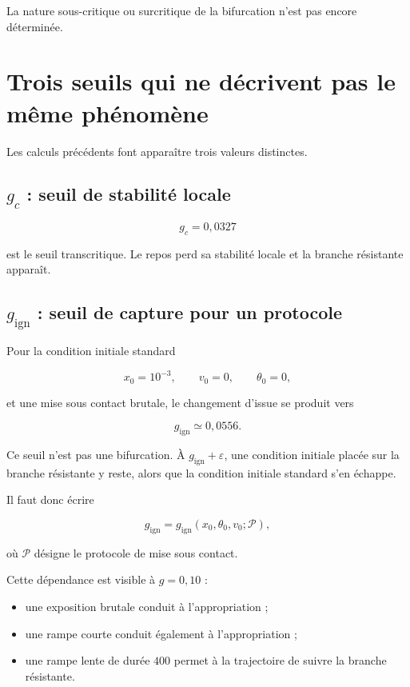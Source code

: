 La nature sous-critique ou surcritique de la bifurcation n'est pas encore déterminée.

\chapter{Trois seuils qui ne décrivent pas le même phénomène}\label{t2-trois-seuils-phenomenes-distincts}

Les calculs précédents font apparaître trois valeurs distinctes.

\section{\texorpdfstring{\(g_c\)}{gc} : seuil de stabilité locale}\label{t2-g_c-seuil-de-stabilite-locale}

\[
g_c=0{,}0327
\]

est le seuil transcritique. Le repos perd sa stabilité locale et la
branche résistante apparaît.

\section{\texorpdfstring{\(g_{\mathrm{ign}}\)}{g ign} : seuil de capture pour un protocole}\label{t2-g_mathrmign-seuil-de-capture-pour-un-protocole}

Pour la condition initiale standard

\[
x_0=10^{-3},
\qquad
v_0=0,
\qquad
\theta_0=0,
\]

et une mise sous contact brutale, le changement d'issue se produit vers

\[
g_{\mathrm{ign}}\simeq0{,}0556.
\]

Ce seuil n'est pas une bifurcation. À \(g_{\mathrm{ign}}+\varepsilon\), une condition initiale placée sur la branche résistante y reste, alors que la condition initiale standard s'en échappe.

Il faut donc écrire

\[
g_{\mathrm{ign}}
=
g_{\mathrm{ign}}(x_0,\theta_0,v_0;\mathcal P),
\]

où \(\mathcal P\) désigne le protocole de mise sous contact.

Cette dépendance est visible à \(g=0{,}10\) :

\begin{itemize}
\tightlist
\item
  une exposition brutale conduit à l'appropriation ;
\item
  une rampe courte conduit également à l'appropriation ;
\item
  une rampe lente de durée \(400\) permet à la trajectoire de suivre la
  branche résistante.
\end{itemize}

